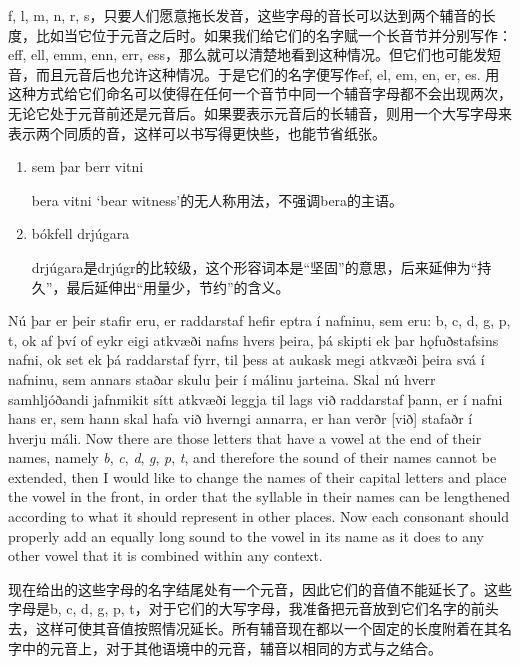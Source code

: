 \begin{translation*}{}
    f, l, m, n, r, s，只要人们愿意拖长发音，这些字母的音长可以达到两个辅音的长度，比如当它位于元音之后时。如果我们给它们的名字赋一个长音节并分别写作：eff, ell, emm, enn, err, ess，那么就可以清楚地看到这种情况。但它们也可能发短音，而且元音后也允许这种情况。于是它们的名字便写作ef, el, em, en, er, es. 用这种方式给它们命名可以使得在任何一个音节中同一个辅音字母都不会出现两次，无论它处于元音前还是元音后。如果要表示元音后的长辅音，则用一个大写字母来表示两个同质的音，这样可以书写得更快些，也能节省纸张。
\end{translation*}
\begin{grammar*}{}
    \begin{enumerate}[leftmargin=*]
        \item sem þar berr vitni

              bera vitni `bear witness'的无人称用法，不强调bera的主语。

        \item bókfell drjúgara

              drjúgara是drjúgr的比较级，这个形容词本是“坚固”的意思，后来延伸为“持久”，最后延伸出“用量少，节约”的含义。
    \end{enumerate}
\end{grammar*}
\begin{paracol}{2}
    Nú þar er þeir stafir eru, er raddarstaf hefir eptra í nafninu, sem eru: b, c, d, g, p, t, ok af því of eykr eigi atkvæði nafns hvers þeira, þá skipti ek þar hǫfuðstafsins nafni, ok set ek þá raddarstaf fyrr, til þess at aukask megi atkvæði þeira svá í nafninu, sem annars staðar skulu þeir í málinu jarteina. Skal nú hverr samhljóðandi jafnmikit sítt atkvæði leggja til lags við raddarstaf þann, er í nafni hans er, sem hann skal hafa við hverngi annarra, er han verðr [við] stafaðr í hverju máli.
    \switchcolumn
    Now there are those letters that have a vowel at the end of their names, namely \textit{b}, \textit{c}, \textit{d}, \textit{g}, \textit{p}, \textit{t}, and therefore the sound of their names cannot be extended, then I would like to change the names of their capital letters and place the vowel in the front, in order that the syllable in their names can be lengthened according to what it should represent in other places. Now each consonant should properly add an equally long sound to the vowel in its name as it does to any other vowel that it is combined within any context.
\end{paracol}
\begin{translation*}{}
    现在给出的这些字母的名字结尾处有一个元音，因此它们的音值不能延长了。这些字母是b, c, d, g, p, t，对于它们的大写字母，我准备把元音放到它们名字的前头去，这样可使其音值按照情况延长。所有辅音现在都以一个固定的长度附着在其名字中的元音上，对于其他语境中的元音，辅音以相同的方式与之结合。
\end{translation*}
